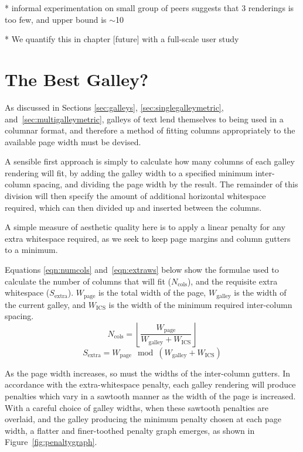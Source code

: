 
* informal experimentation on small group of peers suggests that 3 renderings is too few, and upper bound is $\sim$10

* We quantify this in chapter [future] with a full-scale user study

\section{The Best Galley?}
\label{sec:layout}

As discussed in Sections \ref{sec:galleys}, \ref{sec:singlegalleymetric}, and~\ref{sec:multigalleymetric}, galleys of text lend themselves to being used in a columnar format, and therefore a method of fitting columns appropriately to the available page width must be devised.

A sensible first approach is simply to calculate how many columns of each galley rendering will fit, by adding the galley width to a specified minimum inter-column spacing, and dividing the page width by the result. The remainder of this division will then specify the amount of additional horizontal whitespace required, which can then divided up and inserted between the columns.

A simple measure of aesthetic quality here is to apply a linear penalty for any extra whitespace required, as we seek to keep page margins and column gutters to a minimum.

Equations \ref{eqn:numcols} and~\ref{eqn:extraws} below show the formulae used to calculate the number of columns that will fit ($N_\text{cols}$), and the requisite extra whitespace ($S_\text{extra}$). $W_\text{page}$ is the total width of the page, $W_\text{galley}$ is the width of the current galley, and $W_\text{ICS}$ is the width of the minimum required inter-column spacing.
\begin{equation}\label{eqn:numcols}
N_\text{cols}=\left\lfloor\frac{W_\text{page}}{W_\text{galley}+W_\text{ICS}}\right\rfloor
\end{equation}
\begin{equation}\label{eqn:extraws}
S_\text{extra}=W_\text{page}\!\!\mod \left(W_\text{galley}+W_\text{ICS}\right)
\end{equation}

As the page width increases, so must the widths of the inter-column gutters. In accordance with the extra-whitespace penalty, each galley rendering will produce penalties which vary in a sawtooth manner as the width of the page is increased. With a careful choice of galley widths, when these sawtooth penalties are overlaid, and the galley producing the minimum penalty chosen at each page width, a flatter and finer-toothed penalty graph emerges, as shown in Figure~\ref{fig:penaltygraph}.

